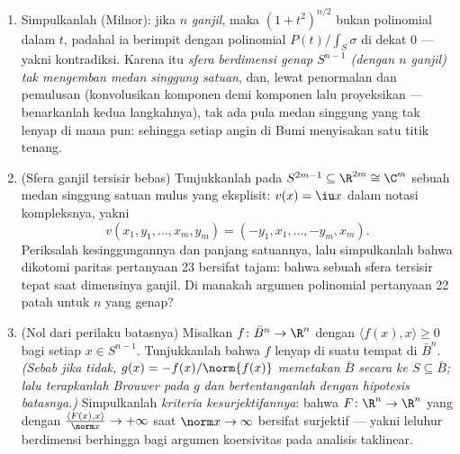\begin{problem}
\begin{enumerate}[resume]
        Simpulkanlah, dengan memakai \cref{lem:b3:forms:consistency} dan
        penskalaan $\sigma_{\lambda x} =
        \lambda^{n}\,\sigma_x$ di bawah $x \mapsto \lambda x$
        (periksalah), bahwa
        \[
        P(t) = \pm(1 + t^2)^{n/2}\int_S\sigma,
        \qquad\text{dengan tanda } + \text{ untuk nilai kecil } t
        \]
        ( terawetkan lewat  dari $t = 0$).
  \item Simpulkanlah (Milnor): jika $n$ \emph{ganjil}, maka $(1 +
        t^2)^{n/2}$ bukan polinomial dalam $t$, padahal ia
        berimpit dengan polinomial $P(t)/\int_S\sigma$ di dekat
        $0$ --- yakni kontradiksi. Karena itu \emph{sfera
        berdimensi genap $S^{n-1}$ (dengan $n$ ganjil) tak mengemban
        medan singgung satuan}, dan, lewat penormalan dan
        pemulusan (konvolusikan komponen demi komponen lalu proyeksikan ---
        benarkanlah kedua langkahnya), tak ada pula medan singgung 
        yang tak lenyap di mana pun: sehingga setiap angin di Bumi menyisakan
        satu titik tenang.

  \item (Sfera ganjil tersisir bebas) Tunjukkanlah pada $S^{2m-1}
        \subseteq \R^{2m} \cong \C^m$ sebuah medan singgung
        satuan mulus yang eksplisit: $v(x) = \iu x$ dalam notasi
        kompleksnya, yakni
        \[
        v(x_1, y_1, \dots, x_m, y_m) =
        (-y_1, x_1, \dots, -y_m, x_m) .
        \]
        Periksalah kesinggungannya dan panjang satuannya, lalu simpulkanlah bahwa
        dikotomi paritas pertanyaan 23 bersifat tajam: bahwa sebuah
        sfera tersisir tepat saat dimensinya
        ganjil. Di manakah argumen polinomial pertanyaan
        22 patah untuk $n$ yang genap?
  \item (Nol dari perilaku batasnya) Misalkan $f \colon \bar
        B^n \to \R^n$  dengan $\langle f(x),
        x\rangle \geq 0$ bagi setiap $x \in S^{n-1}$. Tunjukkanlah
        bahwa $f$ lenyap di suatu tempat di $\bar B^n$.
        \emph{(Sebab jika tidak, $g(x) = -f(x)/\norm{f(x)}$ memetakan
        $\bar B$ secara  ke $S \subseteq \bar B$;
        lalu terapkanlah Brouwer pada $g$ dan bertentanganlah dengan hipotesis
        batasnya.)} Simpulkanlah \emph{kriteria
        kesurjektifannya}: bahwa $F\colon\R^n\to\R^n$ yang  dengan
        $\frac{\langle F(x), x\rangle}{\norm x} \to
        +\infty$ saat $\norm x \to \infty$ bersifat surjektif ---
        yakni leluhur berdimensi berhingga bagi argumen koersivitas
        pada analisis taklinear.

\end{enumerate}
\end{problem}
